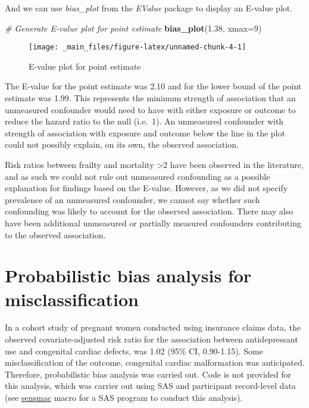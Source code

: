 \documentclass[
]{book}
\newenvironment{Shaded}{\begin{snugshade}}{\end{snugshade}}
\newcommand{\AttributeTok}[1]{\textcolor[rgb]{0.13,0.29,0.53}{#1}}
\newcommand{\CommentTok}[1]{\textcolor[rgb]{0.56,0.35,0.01}{\textit{#1}}}
\newcommand{\DecValTok}[1]{\textcolor[rgb]{0.00,0.00,0.81}{#1}}
\newcommand{\FloatTok}[1]{\textcolor[rgb]{0.00,0.00,0.81}{#1}}
\newcommand{\FunctionTok}[1]{\textcolor[rgb]{0.13,0.29,0.53}{\textbf{#1}}}
\newcommand{\NormalTok}[1]{#1}
\begin{document}
And we can use \emph{bias\_plot} from the \emph{EValue} package to display an E-value plot.

\begin{Shaded}
\begin{Highlighting}[]
\CommentTok{\# Generate E{-}value plot for point estimate}
\FunctionTok{bias\_plot}\NormalTok{(}\FloatTok{1.38}\NormalTok{, }\AttributeTok{xmax=}\DecValTok{9}\NormalTok{) }
\end{Highlighting}
\end{Shaded}

\begin{figure}

{\centering \texttt{[image: \_main\_files/figure-latex/unnamed-chunk-4-1]} 

}

\caption{E-value plot for point estimate}\label{fig:unnamed-chunk-4}
\end{figure}

The E-value for the point estimate was 2.10 and for the lower bound of the point estimate was 1.99. This represents the minimum strength of association that an unmeasured confounder would need to have with either exposure or outcome to reduce the hazard ratio to the null (i.e.~1). An unmeasured confounder with strength of association with exposure and outcome below the line in the plot could not possibly explain, on its own, the observed association.

Risk ratios between frailty and mortality \textgreater2 have been observed in the literature, and as such we could not rule out unmeasured confounding as a possible explanation for findings based on the E-value. However, as we did not specify prevalence of an unmeasured confounder, we cannot say whether such confounding was likely to account for the observed association. There may also have been additional unmeasured or partially measured confounders contributing to the observed association.

\hypertarget{probabilistic-bias-analysis-for-misclassification}{%
\section{Probabilistic bias analysis for misclassification}\label{probabilistic-bias-analysis-for-misclassification}}

In a cohort study of pregnant women conducted using insurance claims data, the observed covariate-adjusted risk ratio for the association between antidepressant use and congenital cardiac defects, was 1.02 (95\% CI, 0.90-1.15).\citep{huybrechts2014antidepressant} Some misclassification of the outcome, congenital cardiac malformation was anticipated. Therefore, probabilistic bias analysis was carried out.\citep{fox2005method} Code is not provided for this analysis, which was carrier out using SAS and participant record-level data (see \href{https://sites.google.com/site/biasanalysis/sensmac}{sensmac} macro for a SAS program to conduct this analysis).
\end{document}
